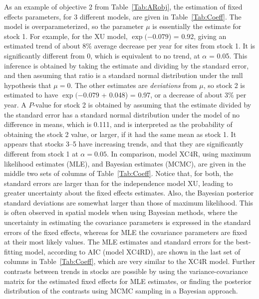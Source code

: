 \documentclass[11pt, titlepage]{article}\usepackage[]{graphicx}\usepackage[]{color}
\begin{document}
\begin{spacing}{1.9}
\begin{flushleft}
As an example of objective 2 from Table~\ref{Tab:ARobj}, the estimation of fixed effects parameters, for 3 different models, are given in Table~\ref{Tab:Coeff}.  The model is overparameterized, so the parameter $\mu$ is essentially the estimate for stock 1. For example, for the XU model, $\exp($\ensuremath{-0.079}) = 0.92, giving an estimated trend of about 8\% average decrease per year for sites from stock 1. It is significantly different from 0, which is equivalent to no trend, at $\alpha$ = 0.05. This inference is obtained by taking the estimate and dividing by the standard error, and then assuming that ratio is a standard normal distribution under the null hypothesis that $\mu = 0$. The other estimates are \emph{deviations} from $\mu$, so stock 2 is estimated to have $\exp($\ensuremath{-0.079} + 0.048) = 0.97, or a decrease of about 3\% per year.  A $P$-value for stock 2 is obtained by assuming that the estimate divided by the standard error has a standard normal distribution under the model of no difference in means, which is 0.111, and is interpreted as the probability of obtaining the stock 2 value, or larger, if it had the same mean as stock 1.  It appears that stocks 3--5 have increasing trends, and that they are significantly different from stock 1 at $\alpha = 0.05$.  In comparison, model XC4R, using maximum likelihood estimates (MLE), and Bayesian estimates (MCMC), are given in the middle two sets of columns of Table~\ref{Tab:Coeff}.  Notice that, for both, the standard errors are larger than for the independence model XU, leading to greater uncertainty about the fixed effects estimates.  Also, the Bayesian posterior standard deviations are somewhat larger than those of maximum likelihood.  This is often observed in spatial models when using Bayesian methods, where the uncertainty in estimating the covariance parameters is expressed in the standard errors of the fixed effects, whereas for MLE the covariance parameters are fixed at their most likely values.  The MLE estimates and standard errors for the best-fitting model, according to AIC (model XC4RD), are shown in the last set of columns in Table~\ref{Tab:Coeff}, which are very similar to the XC4R model.  Further contrasts between trends in stocks are possible by using the variance-covariance matrix for the estimated fixed effects for MLE estimates, or finding the posterior distribution of the contrasts using MCMC sampling in a Bayesian approach.


\end{flushleft}
\end{spacing}
\end{document}

